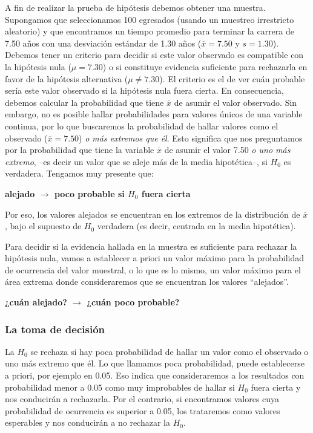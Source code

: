 \documentclass[]{book}
\begin{document}
A fin de realizar la prueba de hipótesis debemos obtener una muestra.
Supongamos que seleccionamos 100 egresados (usando un muestreo
irrestricto aleatorio) y que encontramos un tiempo promedio para
terminar la carrera de 7.50 años con una desviación estándar de 1.30
años (\(\overline{x} = 7.50\) y \(s = 1.30\)). Debemos tener un criterio
para decidir si este valor observado es compatible con la hipótesis nula (\(\mu = 7.30\)) o si constituye evidencia suficiente para rechazarla en favor de la hipótesis alternativa (\(\mu \neq 7.30\)). El criterio es el de ver cuán probable sería este valor observado si la hipótesis nula fuera cierta. En consecuencia, debemos calcular la probabilidad que tiene \(\overline{x}\) de asumir el valor observado. Sin embargo, no es posible hallar probabilidades para valores únicos de una variable continua, por lo que buscaremos la probabilidad de hallar valores como el observado (\(\overline{x}=7.50\)) \emph{o más extremos que él}. Esto significa que nos preguntamos por la probabilidad que tiene la variable \(\overline{x}\) de asumir el valor 7.50 \emph{o uno más extremo}, --es decir un valor que se aleje más de la media hipotética--, si \(H_{0}\) es verdadera. Tengamos muy presente que:

\textbf{alejado \(\rightarrow\) poco probable si \(H_{0}\) fuera cierta}

Por eso, los valores alejados se encuentran en los extremos de la distribución de \(\overline{x}\), bajo el supuesto de \(H_{0}\) verdadera (es decir, centrada en la media hipotética).

Para decidir si la evidencia hallada en la muestra es suficiente para
rechazar la hipótesis nula, vamos a establecer a priori un valor máximo
para la probabilidad de ocurrencia del valor muestral, o lo que es lo
mismo, un valor máximo para el área extrema donde consideraremos que se
encuentran los valores ``alejados''.

\textbf{¿cuán alejado? \(\rightarrow\) ¿cuán poco probable?}

\hypertarget{la-toma-de-decisiuxf3n}{%
\subsubsection{La toma de decisión}\label{la-toma-de-decisiuxf3n}}

La \(H_{0}\) se rechaza si hay poca probabilidad de hallar un valor como el observado o uno más extremo que él. Lo que llamamos poca probabilidad,
puede establecerse a priori, por ejemplo en 0.05. Eso indica que
consideraremos a los resultados con probabilidad menor a 0.05 como muy
improbables de hallar si \(H_{0}\) fuera cierta y nos conducirán a
rechazarla. Por el contrario, si encontramos valores cuya probabilidad
de ocurrencia es superior a 0.05, los trataremos como valores esperables y nos conducirán a no rechazar la \(H_{0}\).
\end{document}
